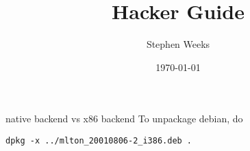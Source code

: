 \documentclass[12pt,openany]{report}
\title{{\mlton} Hacker Guide}
\author{Stephen Weeks}
\date{\today}
\begin{document}
\maketitle

\tableofcontents





native backend vs x86 backend
To unpackage debian, do
\begin{verbatim}
dpkg -x ../mlton_20010806-2_i386.deb .
\end{verbatim}
\printindex


\end{document}

